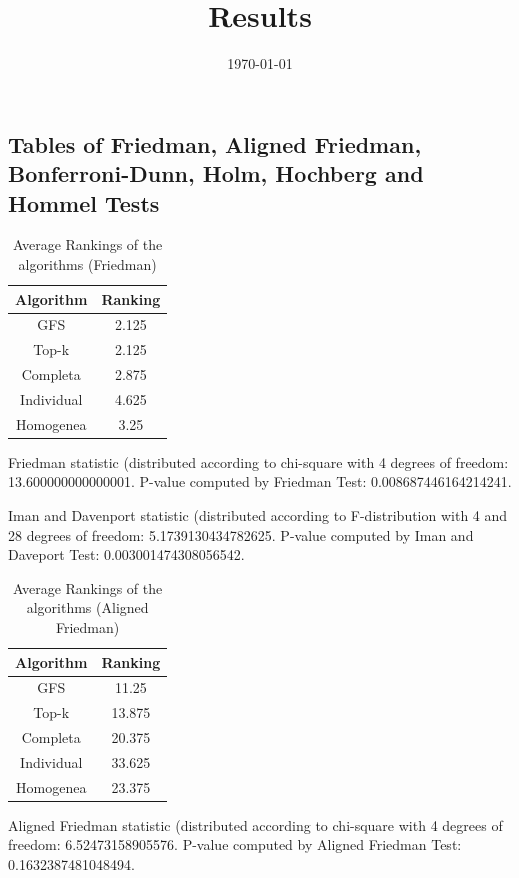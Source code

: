 \documentclass[a4paper,10pt]{article}
\title{Results}
\author{}
\date{\today}
\begin{document}
\begin{landscape}
\oddsidemargin 0in \topmargin 0in\maketitle
\section{Tables of Friedman, Aligned Friedman, Bonferroni-Dunn, Holm, Hochberg and Hommel Tests}
\begin{table}[!htp]
\centering
\caption{Average Rankings of the algorithms (Friedman)
}\begin{tabular}{c|c}
Algorithm&Ranking\\
\hline
GFS&2.125\\
Top-k&2.125\\
Completa&2.875\\
Individual&4.625\\
Homogenea&3.25\\
\end{tabular}
\end{table}


Friedman statistic (distributed according to chi-square with 4 degrees of freedom: 13.600000000000001. 
P-value computed by Friedman Test: 0.008687446164214241.\newline

Iman and Davenport statistic (distributed according to F-distribution with 4 and 28 degrees of freedom: 5.1739130434782625. 
P-value computed by Iman and Daveport Test: 0.003001474308056542.\newline


\newpage

\begin{table}[!htp]
\centering
\caption{Average Rankings of the algorithms (Aligned Friedman)
}\begin{tabular}{c|c}
Algorithm&Ranking\\
\hline
GFS&11.25\\
Top-k&13.875\\
Completa&20.375\\
Individual&33.625\\
Homogenea&23.375\\
\end{tabular}
\end{table}


Aligned Friedman statistic (distributed according to chi-square with 4 degrees of freedom: 6.52473158905576. 
P-value computed by Aligned Friedman Test: 0.1632387481048494.\newline



\end{landscape}
\end{document}
